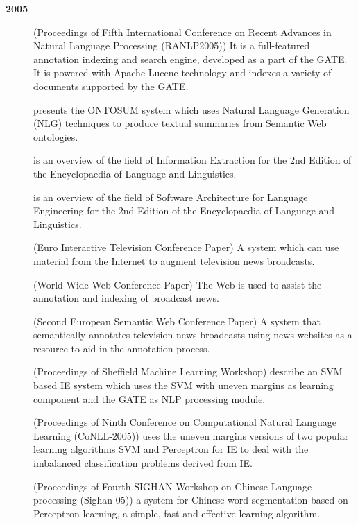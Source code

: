 \textbf{2005}

\begin{description}

\item[\cite{Aswani05}] (Proceedings of Fifth International Conference on Recent Advances in Natural Language Processing (RANLP2005))
It is a full-featured annotation indexing and search engine, developed
as a part of the GATE. It is powered with Apache Lucene technology and
indexes a variety of documents supported by the GATE.

\item[\cite{Bon05a}] presents the ONTOSUM system which uses Natural Language Generation (NLG) techniques to produce textual summaries from Semantic Web ontologies.

\item[\cite{Cun05a}] is an overview of the field of Information Extraction
for the 2nd Edition of the Encyclopaedia of Language and Linguistics.
%
\item[\cite{Cun05b}] is an overview of the field of Software Architecture
for Language Engineering
for the 2nd Edition of the Encyclopaedia of Language and Linguistics.
%
\item[\cite{DowmanEtAl05b}] (Euro Interactive Television Conference Paper)
A system which can use material from the Internet to augment television news broadcasts.
%
\item[\cite{DowmanEtAl05a}] (World Wide Web Conference Paper)
The Web is used to assist the annotation and indexing of broadcast news.
%
\item[\cite{DowmanEtAl05c}] (Second European Semantic Web Conference Paper)
A system that semantically annotates television news broadcasts using
news websites as a resource to aid in the annotation process.
%
\item[\cite{Yaoyong05}] (Proceedings of Sheffield Machine Learning Workshop)
describe an SVM based IE system which uses the SVM with uneven margins
as learning component and the GATE as NLP processing module.
%
\item[\cite{Yaoyong05a}] (Proceedings of Ninth Conference on Computational Natural Language Learning (CoNLL-2005))
uses the uneven margins versions of two popular learning algorithms SVM and Perceptron for IE to 
deal with the imbalanced classification problems derived from IE. 

\item[\cite{Yaoyong05b}] (Proceedings of Fourth SIGHAN Workshop on Chinese Language processing (Sighan-05))
a system for Chinese word segmentation based on Perceptron learning, a
simple, fast and effective learning algorithm.


\end{description}
